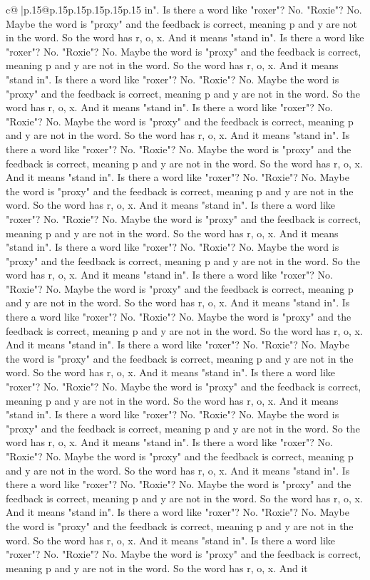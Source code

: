 \documentclass{article}
\begin{document}
{\begin{supertabular}{c@{$\;$}|p{.15\linewidth}@{}p{.15\linewidth}p{.15\linewidth}p{.15\linewidth}p{.15\linewidth}p{.15\linewidth}}
{{{in". Is there a word like "roxer"? No. "Roxie"? No. Maybe the word is "proxy" and the feedback is correct, meaning p and y are not in the word. So the word has r, o, x. And it means "stand in". Is there a word like "roxer"? No. "Roxie"? No. Maybe the word is "proxy" and the feedback is correct, meaning p and y are not in the word. So the word has r, o, x. And it means "stand in". Is there a word like "roxer"? No. "Roxie"? No. Maybe the word is "proxy" and the feedback is correct, meaning p and y are not in the word. So the word has r, o, x. And it means "stand in". Is there a word like "roxer"? No. "Roxie"? No. Maybe the word is "proxy" and the feedback is correct, meaning p and y are not in the word. So the word has r, o, x. And it means "stand in". Is there a word like "roxer"? No. "Roxie"? No. Maybe the word is "proxy" and the feedback is correct, meaning p and y are not in the word. So the word has r, o, x. And it means "stand in". Is there a word like "roxer"? No. "Roxie"? No. Maybe the word is "proxy" and the feedback is correct, meaning p and y are not in the word. So the word has r, o, x. And it means "stand in". Is there a word like "roxer"? No. "Roxie"? No. Maybe the word is "proxy" and the feedback is correct, meaning p and y are not in the word. So the word has r, o, x. And it means "stand in". Is there a word like "roxer"? No. "Roxie"? No. Maybe the word is "proxy" and the feedback is correct, meaning p and y are not in the word. So the word has r, o, x. And it means "stand in". Is there a word like "roxer"? No. "Roxie"? No. Maybe the word is "proxy" and the feedback is correct, meaning p and y are not in the word. So the word has r, o, x. And it means "stand in". Is there a word like "roxer"? No. "Roxie"? No. Maybe the word is "proxy" and the feedback is correct, meaning p and y are not in the word. So the word has r, o, x. And it means "stand in". Is there a word like "roxer"? No. "Roxie"? No. Maybe the word is "proxy" and the feedback is correct, meaning p and y are not in the word. So the word has r, o, x. And it means "stand in". Is there a word like "roxer"? No. "Roxie"? No. Maybe the word is "proxy" and the feedback is correct, meaning p and y are not in the word. So the word has r, o, x. And it means "stand in". Is there a word like "roxer"? No. "Roxie"? No. Maybe the word is "proxy" and the feedback is correct, meaning p and y are not in the word. So the word has r, o, x. And it means "stand in". Is there a word like "roxer"? No. "Roxie"? No. Maybe the word is "proxy" and the feedback is correct, meaning p and y are not in the word. So the word has r, o, x. And it means "stand in". Is there a word like "roxer"? No. "Roxie"? No. Maybe the word is "proxy" and the feedback is correct, meaning p and y are not in the word. So the word has r, o, x. And it means "stand in". Is there a word like "roxer"? No. "Roxie"? No. Maybe the word is "proxy" and the feedback is correct, meaning p and y are not in the word. So the word has r, o, x. And it means "stand in". Is there a word like "roxer"? No. "Roxie"? No. Maybe the word is "proxy" and the feedback is correct, meaning p and y are not in the word. So the word has r, o, x. And it }}}
\end{supertabular}}
\end{document}
